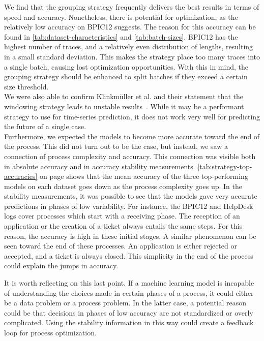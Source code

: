 We find that the grouping strategy frequently delivers the best results in terms of speed and accuracy.
Nonetheless, there is potential for optimization, as the relatively low accuracy on BPIC12 suggests.
The reason for this accuracy can be found in \autoref{tab:dataset-characteristics} and \autoref{tab:batch-sizes}.
BPIC12 has the highest number of traces, and a relatively even distribution of lengths, resulting in a small standard deviation.
This makes the strategy place too many traces into a single batch, causing lost optimization opportunities.
With this in mind, the grouping strategy should be enhanced to split batches if they exceed a certain size threshold.\\

We were also able to confirm Klinkmüller et al. and their statement that the windowing strategy leads to unstable results~\cite{klinkmuller2018reliablemonitoring}.
While it may be a performant strategy to use for time-series prediction, it does not work very well for predicting the future of a single case.\\

Furthermore, we expected the models to become more accurate toward the end of the process.
This did not turn out to be the case, but instead, we saw a connection of process complexity and accuracy.
This connection was visible both in absolute accuracy and in accuracy stability measurements.
\autoref{tab:strategy-top-accuracies} on page \pageref{tab:strategy-top-accuracies} shows that the mean accuracy of the three top-performing models on each dataset goes down as the process complexity goes up.
In the stability measurements, it was possible to see that the models gave very accurate predictions in phases of low variability.
For instance, the BPIC12 and HelpDesk logs cover processes which start with a receiving phase.
The reception of an application or the creation of a ticket always entails the same steps.
For this reason, the accuracy is high in these initial stages.
A similar phenomenon can be seen toward the end of these processes.
An application is either rejected or accepted, and a ticket is always closed.
This simplicity in the end of the process could explain the jumps in accuracy.

It is worth reflecting on this last point.
If a machine learning model is incapable of understanding the choices made in certain phases of a process, it could either be a data problem or a process problem.
In the latter case, a potential reason could be that decisions in phases of low accuracy are not standardized or overly complicated.
Using the stability information in this way could create a feedback loop for process optimization.\\

